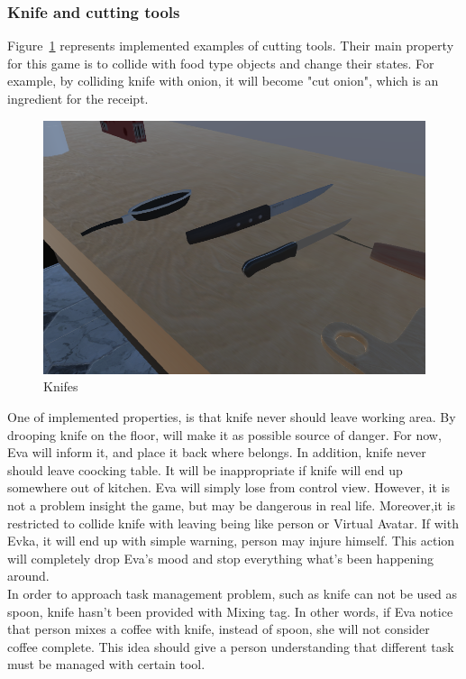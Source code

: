 \documentclass[18pt]{article}
\numberwithin{equation}{section} %
\numberwithin{figure}{section} %
\numberwithin{table}{section} %
\begin{document}
		\subsubsection{Knife and cutting tools}
			Figure~\ref{fig:knife_spoon} represents implemented examples of cutting tools. Their main property for this game is to collide with food type objects and change their states. For example, by colliding knife with onion, it will become "cut onion", which is an ingredient for the receipt. \\
				\begin{figure}[H]
					\centering
					\includegraphics[width=0.5\linewidth]{images/knife_spoon}
					\caption{Knifes}
					\label{fig:knife_spoon}
				\end{figure}
			One of implemented properties, is that knife never should leave working area. By drooping knife on the floor, will make it as possible source of danger. For now, Eva will inform it, and place it back where belongs. In addition, knife never should leave coocking table. It will be inappropriate if knife will end up somewhere out of kitchen. Eva will simply lose from control view. However, it is not a problem insight the game, but may be dangerous in real life. Moreover,it is restricted to collide knife with leaving being like person or Virtual Avatar. If with Evka, it will end up with simple warning, person may injure himself. This action will completely drop Eva's mood and stop everything what's been happening around. \\
			In order to approach task management problem, such as knife can not be used as spoon, knife hasn't been provided with Mixing tag. In other words, if Eva notice that person mixes a coffee with knife, instead of spoon, she will not consider coffee complete. This idea should give a person understanding that different task must be managed with certain tool. \\
\end{document}
